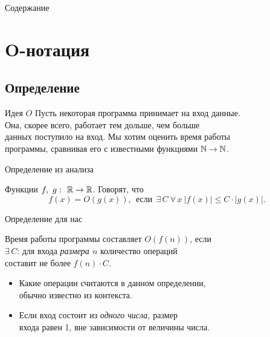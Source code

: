 \documentclass[12pt,aspectratio=169,svgnames]{beamer}
\begin{document}
 \maketitle

\begin{frame}{Содержание}
	\tableofcontents
\end{frame}

\section{O-нотация}

\subsection{Определение}

\begin{frame}{Идея \(O\)}
	Пусть некоторая программа принимает на вход данные. \\
	Она, скорее всего, работает тем дольше, чем больше \\
	данных поступило на вход. Мы хотим оценить время работы \\
	программы, сравнивая его с известными функциями \(\mathbb{N} \to \mathbb{N}\).
\end{frame}


\begin{frame}{Определение из анализа}
\begin{defn}
	Функции \(f,\ g\,\colon\ \mathbb{R} \to \mathbb{R}\). Говорят, что
		\[f(x) = O(g(x)),\ \ \text{если}\ \ \exists\,C\ \forall\,x\ 
			|f(x)| \le C \cdot |g(x)|. \]
\end{defn}
\end{frame}


\begin{frame}{Определение для нас} \ \\
\begin{defn}
	Время работы программы составляет \(O(f(n))\), если \\
	\(\exists\, C\): для входа {\it размера \(n\)} количество операций \\
	составит не более \(f(n) \cdot C\).
\end{defn}

\begin{itemize}
	\item Какие операции считаются в данном определении, \\
	      обычно известно из контекста.
	\item Если вход состоит из {\it одного числа,} размер \\
	      входа равен 1, вне зависимости от величины числа.
\end{itemize}
\end{frame}
\end{document}

